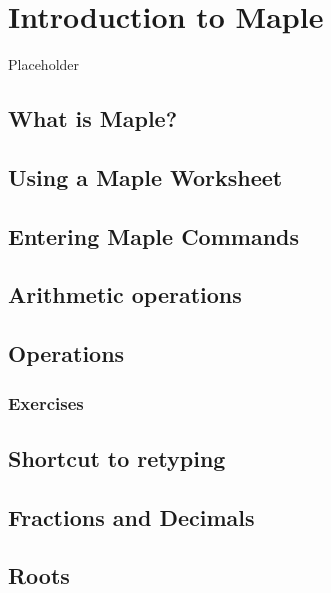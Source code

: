 \documentclass[
]{book}
\theoremstyle{definition}
\theoremstyle{definition}
\theoremstyle{definition}
\theoremstyle{definition}
\theoremstyle{remark}
\begin{document}
\chapter{Introduction to Maple}\label{introduction-to-maple-1}

Placeholder

\section{What is Maple?}\label{what-is-maple-1}

\section{Using a Maple Worksheet}\label{using-a-maple-worksheet-1}

\section{Entering Maple Commands}\label{entering-maple-commands-1}

\section{Arithmetic operations}\label{arithmetic-operations-1}

\section{Operations}\label{operations-1}

\subsection{Exercises}\label{exercises-2}

\section{Shortcut to retyping}\label{shortcut-to-retyping-1}

\section{Fractions and Decimals}\label{fractions-and-decimals-1}

\section{Roots}\label{roots-1}
\end{document}
